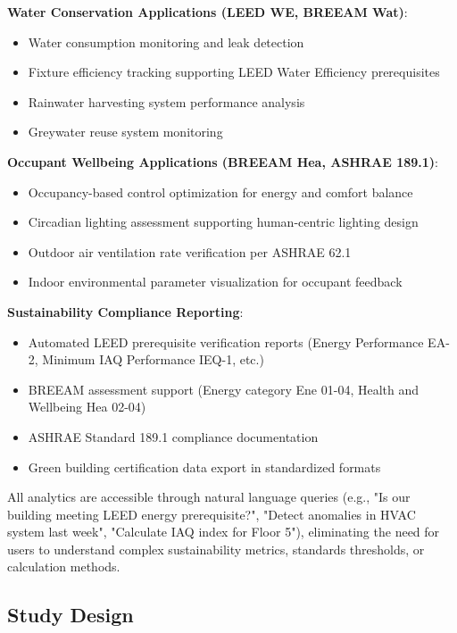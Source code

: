 \documentclass[acmlarge]{acmart}
\begin{document}
\textbf{Water Conservation Applications (LEED WE, BREEAM Wat)}:
\begin{itemize}
    \item Water consumption monitoring and leak detection
    \item Fixture efficiency tracking supporting LEED Water Efficiency prerequisites
    \item Rainwater harvesting system performance analysis
    \item Greywater reuse system monitoring
\end{itemize}

\textbf{Occupant Wellbeing Applications (BREEAM Hea, ASHRAE 189.1)}:
\begin{itemize}
    \item Occupancy-based control optimization for energy and comfort balance
    \item Circadian lighting assessment supporting human-centric lighting design
    \item Outdoor air ventilation rate verification per ASHRAE 62.1
    \item Indoor environmental parameter visualization for occupant feedback
\end{itemize}

\textbf{Sustainability Compliance Reporting}:
\begin{itemize}
    \item Automated LEED prerequisite verification reports (Energy Performance EA-2, Minimum IAQ Performance IEQ-1, etc.)
    \item BREEAM assessment support (Energy category Ene 01-04, Health and Wellbeing Hea 02-04)
    \item ASHRAE Standard 189.1 compliance documentation
    \item Green building certification data export in standardized formats
\end{itemize}

All analytics are accessible through natural language queries (e.g., "Is our building meeting LEED energy prerequisite?", "Detect anomalies in HVAC system last week", "Calculate IAQ index for Floor 5"), eliminating the need for users to understand complex sustainability metrics, standards thresholds, or calculation methods.

\subsection{Study Design}
\end{document}
